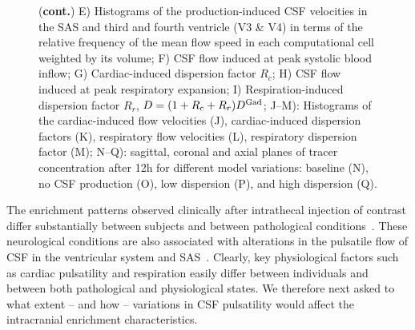 \documentclass[fleqn,10pt]{wlscirep}
\begin{document}
\begin{figure}
\ContinuedFloat
\caption{(\textbf{cont.})
E) Histograms of the production-induced CSF velocities in the SAS and third and fourth ventricle (V3 \& V4) in terms of the relative frequency of the mean flow speed in each computational cell weighted by its volume; 
F) CSF flow induced at peak systolic blood inflow; 
G) Cardiac-induced dispersion factor $R_c$;
H) CSF flow induced at peak respiratory expansion; 
I) Respiration-induced dispersion factor $R_r$, $D = (1 + R_c + R_r) D^{\rm Gad}$; J--M): Histograms of the cardiac-induced flow velocities (J),
cardiac-induced dispersion factors (K),
respiratory flow velocities (L), respiratory dispersion factor (M);
N--Q): sagittal, coronal and axial planes of tracer concentration after 12h for different model variations: baseline (N), no CSF production (O), low dispersion (P), and high dispersion (Q).
}
\end{figure}  

The enrichment patterns observed clinically after intrathecal
injection of contrast differ substantially between subjects and
between pathological conditions~\cite{ringstad2018brain,
  eide2021direction, eide2021impaired, eide2022altered}. These
neurological conditions are also associated with alterations in the
pulsatile flow of CSF in the ventricular system and
SAS~\cite{eide2021direction}. Clearly, key physiological factors such
as cardiac pulsatility and respiration easily differ between
individuals and between both pathological and physiological states. We
therefore next asked to what extent -- and how -- variations in CSF
pulsatility would affect the intracranial enrichment characteristics.
\end{document}
